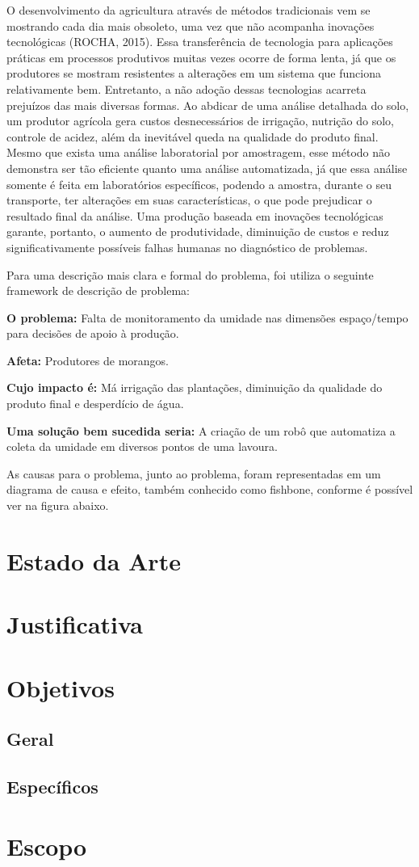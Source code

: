   O desenvolvimento da agricultura através de métodos tradicionais vem se
  mostrando cada dia mais obsoleto, uma vez que não acompanha inovações
  tecnológicas (ROCHA, 2015). Essa transferência de tecnologia para aplicações
  práticas em processos produtivos muitas vezes ocorre de forma lenta, já que
  os produtores se mostram resistentes a alterações em um sistema que funciona
  relativamente bem. Entretanto, a não adoção dessas tecnologias acarreta
  prejuízos das mais diversas formas. Ao abdicar de uma análise detalhada do
  solo, um produtor agrícola gera custos desnecessários de irrigação, nutrição
  do solo, controle de acidez, além da inevitável queda na qualidade do produto
  final. Mesmo que exista uma análise laboratorial por amostragem, esse método
  não demonstra ser tão eficiente quanto uma análise automatizada, já que essa
  análise somente é feita em laboratórios específicos, podendo a amostra,
  durante o seu transporte, ter alterações em suas características, o que pode
  prejudicar o resultado final da análise. Uma produção baseada em inovações
  tecnológicas garante, portanto, o aumento de produtividade, diminuição de
  custos e reduz significativamente possíveis falhas humanas no diagnóstico de
  problemas.

  Para uma descrição mais clara e formal do problema, foi utiliza o seguinte
  framework de descrição de problema:

  \textbf{O problema:} Falta de monitoramento da umidade nas dimensões espaço/tempo
  para decisões de apoio à produção.

  \textbf{Afeta:} Produtores de morangos. 

  \textbf{Cujo impacto é:} Má irrigação das plantações, diminuição da qualidade
  do produto final e desperdício de água.

  \textbf{Uma solução bem sucedida seria:} A criação de um robô que automatiza
  a coleta da umidade em diversos pontos de uma lavoura.

  As causas para o problema, junto ao problema, foram representadas em um diagrama
  de causa e efeito, também conhecido como fishbone, conforme é possível ver
  na figura abaixo.

  \section{Estado da Arte}

  \section{Justificativa}

  \section{Objetivos}
  \subsection{Geral}
  \subsection{Específicos}

  \section{Escopo}
